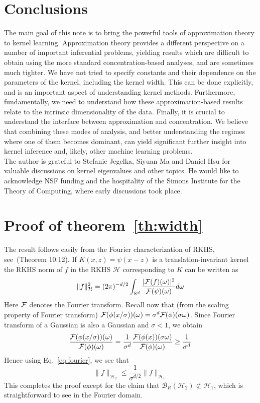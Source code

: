 \documentclass[final,12pt]{colt2018}
\renewcommand{\H}{\mathcal{H}}
\newcommand{\R}{\mathbb{R}}
\newcommand{\Br}{\mathcal{B}_R}
\begin{document}
\section{Conclusions}\label{sec:conclusion}
\vskip-5pt
The main goal of this note is to bring the powerful tools of approximation theory to kernel learning. 
Approximation theory provides a different perspective on a number of important inferential problems, yielding results which are difficult to obtain using the more standard concentration-based analyses, and are sometimes much tighter.
We have not tried to specify constants  and their dependence on the parameters of the kernel, including the kernel width. This can be done explicitly, and is an important aspect of understanding kernel methods. Furthermore, fundamentally, 
we need to understand how these approximation-based results relate to the intrinsic dimensionality of the data. 
Finally, it is crucial to understand the interface between approximation and concentration.  We believe that combining these modes of analysis, and better understanding the regimes 
where one of them becomes dominant,  can yield significant further insight into kernel inference and, likely, other machine learning problems.\\

%
The author is grateful to  Stefanie Jegelka, Siyuan Ma and Daniel Hsu for valuable  discussions on kernel eigenvalues and other topics. He would like to acknowledge  NSF funding and the  hospitality of the Simons Institute for the Theory of Computing, where  early discussions took place. 



% 
%


\appendix 
\section{Proof of theorem~\ref{th:width}}\label{proof:width}
The result follows easily  from the Fourier characterization of RKHS, see~\cite{wendland2004scattered}(Theorem 10.12). If $K(x,z)=\psi(x-z)$ is a translation-invariant kernel the RKHS norm of $f$ in the RKHS $\H$ corresponding to $K$ can be written as 
\begin{equation}\label{eq:fourier}
\|f\|_{\H}^2 = (2 \pi )^{-d/2} \int_{\R^d} \frac{|{\cal F}(f)(\omega)|^2}{{\cal F}({\psi})(\omega)} d\omega
\end{equation}
Here ${\cal F}$ denotes the Fourier transform. 
Recall now that (from the scaling property of Fourier transform)  ${\cal F} (\phi (x/\sigma))(\omega) = \sigma^d {\cal F}({\phi})(\sigma \omega)$. 
Since Fourier transform of a Gaussian is also a Gaussian and $\sigma <1$,  we obtain  
$$
\frac{{\cal F} (\phi (x/\sigma))(\omega)}{{\cal F} (\phi) (\omega)} =
\frac{1}{\sigma^d} \frac{{\cal F} (\phi (x))(\sigma\omega)}{ {\cal F}({\phi})( \omega)} \ge \frac{1}{\sigma^d}
$$
Hence using Eq.~\ref{eq:fourier}, we see that
$$
\|f\|_{\H_2} \le \frac{1}{\sigma^{d/2}} \|f\|_{\H_1}  
$$
This completes the proof except for the claim that $\Br(\H_2) \not\subset \H_1$, which is straightforward to see in the Fourier domain.
\end{document}
